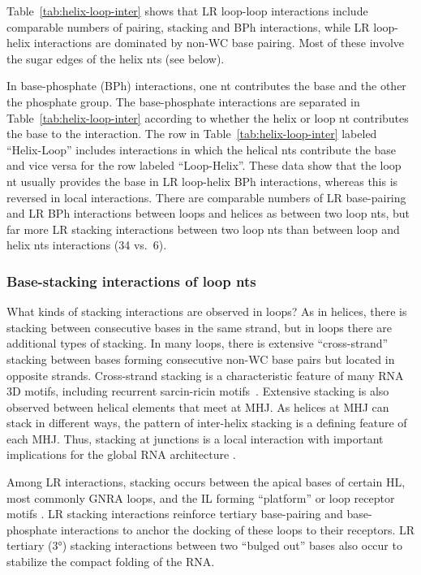 Table~\ref{tab:helix-loop-inter} shows that LR loop-loop interactions include
comparable numbers of pairing, stacking and BPh interactions, while LR
loop-helix interactions are dominated by non-WC base pairing. Most of these
involve the sugar edges of the helix nts (see below). 

In base-phosphate (BPh) interactions, one nt contributes the base and the other
the phosphate group. The base-phosphate interactions are separated in
Table~\ref{tab:helix-loop-inter} according to whether the helix or loop nt
contributes the base to the interaction. The row in
Table~\ref{tab:helix-loop-inter} labeled ``Helix-Loop'' includes interactions in
which the helical nts contribute the base and vice versa for the row labeled
``Loop-Helix''. These data show that the loop nt usually provides the base in LR
loop-helix BPh interactions, whereas this is reversed in local interactions.
There are comparable numbers of LR base-pairing and LR BPh interactions between
loops and helices as between two loop nts, but far more LR stacking interactions
between two loop nts than between loop and helix nts interactions (34 vs.\ 6). 

\subsubsection{Base-stacking interactions of loop nts}

What kinds of stacking interactions are observed in loops? As in helices, there
is stacking between consecutive bases in the same strand, but in loops there are
additional types of stacking. In many loops, there is extensive “cross-strand”
stacking between bases forming consecutive non-WC base pairs but located in
opposite strands. Cross-strand stacking is a characteristic feature of many RNA
3D motifs, including recurrent sarcin-ricin motifs~\cite{Szewczak1993a}.
Extensive stacking is also observed between helical elements that meet at MHJ\@.
As helices at MHJ can stack in different ways, the pattern of inter-helix
stacking is a defining feature of each MHJ\@. Thus, stacking at junctions is a
local interaction with important implications for the global RNA architecture
\cite{Lescoute2006b}. 

Among LR interactions, stacking occurs between the apical bases of certain HL,
most commonly GNRA loops, and the IL forming ``platform'' or loop receptor motifs
\cite{Cate1996}. LR stacking interactions reinforce tertiary base-pairing and
base-phosphate interactions to anchor the docking of these loops to their
receptors. LR tertiary (3°) stacking interactions between two “bulged out” bases
also occur to stabilize the compact folding of the RNA\@. 

